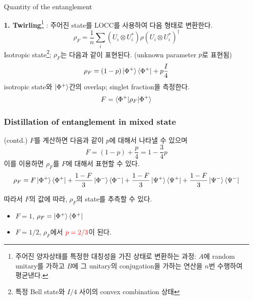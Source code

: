 \documentclass[9pt]{beamer}
\begin{document}
\begin{section}{Quantity of the entanglement}
\begin{frame}
            \vspace{0.1cm}
            \textbf{1. Twirling}\footnote{주어진 양자상태를 특정한 대칭성을 가진 상태로 변환하는 과정: $A$에 random unitary를 가하고 $B$에 그 unitary의 conjugation을 가하는 연산을 $n$번 수행하여 평균낸다.} : 주어진 state를 LOCC를 사용하여 다음 형태로 변환한다.
            \begin{equation*}
                \rho_F = \frac{1}{n} \sum_i (U_i \otimes U_i^*) \rho (U_i \otimes U_i^*)^\dagger
            \end{equation*}
            Isotropic state\footnote{특정 Bell state와 $I/4$ 사이의 convex combination 상태}; $\rho_F$는 다음과 같이 표현된다. (unknown parameter $p$로 표현됨)
            \begin{equation*}
                \rho_F = (1-p) \ket{\Phi^+} \bra{\Phi^+} + p \frac{I}{4}
            \end{equation*}
            isotropic state와 $\ket{\Phi^+}$간의 overlap; singlet fraction을 측정한다.
            \begin{equation*}
                F = \braket{\Phi^+ | \rho_F | \Phi^+}
            \end{equation*}

        \end{frame}

        \begin{frame}
            \frametitle{Distillation of entanglement in mixed state}
            (contd.) $F$를 계산하면 다음과 같이 $p$에 대해서 나타낼 수 있으며
            \begin{equation*}
                F = (1-p) + \frac{p}{4} = 1- \frac{3}{4} p
            \end{equation*}
            이를 이용하면 $\rho_F$를 $F$에 대해서 표현할 수 있다.
            \begin{equation*}
                \rho_F = F\ket{\Phi^+}\bra{\Phi^+} + \frac{1-F}{3} \ket{\Phi^-}\bra{\Phi^-} + \frac{1-F}{3} \ket{\Psi^+} \bra{\Psi^+} + \frac{1-F}{3} \ket{\Psi^-} \bra{\Psi^-}
            \end{equation*} 
            \vspace{0.3cm}

            따라서 $F$의 값에 따라, $\rho_F$의 state를 추측할 수 있다.
            \begin{itemize}
                \item $F=1$, $\rho_F = \ket{\Phi^+}\bra{\Phi^+}$
                \item $F=1/2$, $\rho_F$에서 $\color{red}p=2/3$이 된다. 
            \end{itemize}
            

\end{frame}
\end{section}
\end{document}
